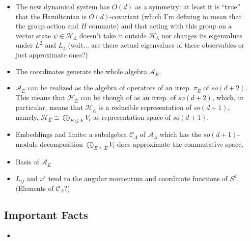 \documentclass{article}
\newcommand{\cut}[1]{\overline{#1}}
\begin{document}
\begin{itemize}
    \item The new dynamical system has $O(d)$ as a symmetry: at least it is ``true'' that the Hamiltonian is $O(d)$-covariant (which I'm defining to mean that the group action and $H$ commute) and that acting with this group on a vector state $\psi \in \mathcal H_\Lambda$ doesn't  take it outside $\mathcal H_\lambda$ nor changes its eigenvalues under $L^2$ and $L_z$ (wait... are there actual eigenvalues of these observables or just approximate ones?)
    
    \item The coordinates generate the whole algebra $\mathcal A_{\cut{E}}$.
    
    \item $\mathcal A_{\cut{E}}$ can be realized as the algebra of operators of an irrep. $\pi_{\cut{E}}$ of $so(d+2)$. This means that $\mathcal H_{\cut{E}}$ can be though of as an irrep. of $so(d+2)$, which, in particular, means that $\mathcal H_{\cut{E}}$ is a reducible representation of $so(d+1)$, namely, $\mathcal H_{\cut{E}} \cong \bigoplus_{E \leq \cut{E}} V_l$ as representation space of $so(d+1)$.
    
    \item Embeddings and limits: a subalgebra $\mathcal C_\Lambda$ of $\mathcal A_{\Lambda}$ which has the $so(d+1)$-module decomposition $\bigoplus_{E \leq \cut{E}} V_l$ does approximate the commutative space.
    
    \item Basis of $\mathcal A_{\cut{E}}$
    
    \item $L_{ij}$ and $x^i$ tend to the angular momentum and coordinate functions of $S^d$. (Elements of $\mathcal C_\Lambda$?)
    
    \end{itemize}

\subsection{Important Facts}

    \begin{itemize}

    \item 
    
    \end{itemize}

\end{document}
